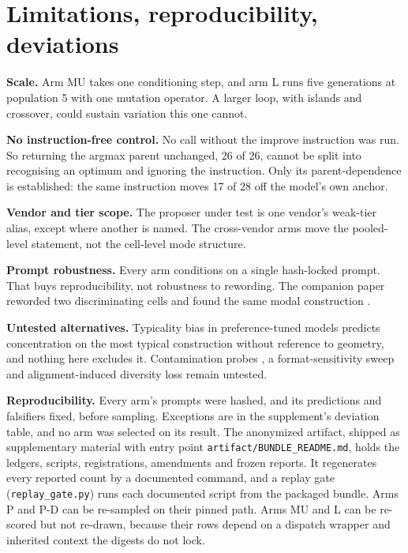\section{Limitations, reproducibility, deviations}\label{sec:limits}

\textbf{Scale.} Arm MU takes one conditioning step, and arm L runs five generations at
population 5 with one mutation operator. A larger loop, with islands and crossover, could
sustain variation this one cannot.

\textbf{No instruction-free control.} No call without the improve instruction was run. So
returning the argmax parent unchanged,
26 of 26, cannot be split into recognising an optimum and ignoring the instruction. Only its
parent-dependence is established: the same instruction moves 17 of 28 off the model's own
anchor.

\textbf{Vendor and tier scope.} The proposer under test is one vendor's weak-tier alias,
except where another is named. The cross-vendor arms move the pooled-level statement, not the
cell-level mode structure.

\textbf{Prompt robustness.} Every arm conditions on a single hash-locked prompt. That buys
reproducibility, not robustness to rewording. The companion paper reworded two discriminating
cells and found the same modal construction \citep{companion}.

\textbf{Untested alternatives.} Typicality bias in preference-tuned models
\citep{zhang2026verbalizedsamplingmitigatemode} predicts concentration on the most typical
construction without reference to geometry, and nothing here excludes it. Contamination
probes \citep{carlini2021extracting,golchin2024timetravel}, a format-sensitivity sweep
\citep{sclar2024formatspread} and alignment-induced diversity loss \citep{kirk2024rlhf} remain
untested.

\textbf{Reproducibility.} Every arm's prompts were hashed, and its predictions and falsifiers
fixed, before sampling. Exceptions are in the supplement's deviation table, and no arm was
selected on its result. The anonymized artifact, shipped as supplementary material with entry
point \texttt{artifact/BUNDLE\_README.md}, holds the ledgers, scripts,
registrations, amendments and frozen reports. It regenerates every reported count by a
documented command, and a replay gate (\texttt{replay\_gate.py}) runs each documented
script from the packaged bundle. Arms P and P-D can be re-sampled on their pinned path. Arms MU and L can be re-scored
but not re-drawn, because their rows depend on a dispatch wrapper and inherited context the
digests do not lock.

